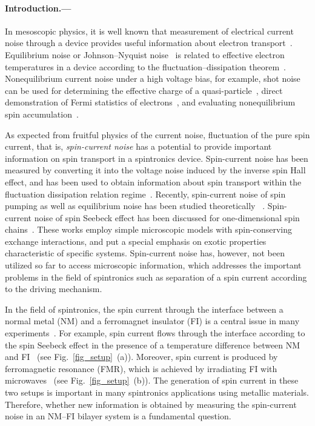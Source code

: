 \documentclass[aps,prl,reprint,showpacs]{revtex4-1}
\begin{document}
\paragraph{Introduction.---}
In mesoscopic physics, it is well known that measurement of electrical current noise 
through a device provides useful information about electron transport~\cite{Blanter00,Martin05}.
Equilibrium noise or Johnson--Nyquist noise~\cite{Johnson28,Nyquist28} is related
to effective electron temperatures in a device according to the fluctuation--dissipation theorem~\cite{Onsager31,Casimir45,Green54,Kubo57}.
Nonequilibrium current noise under a high voltage bias, for example, shot noise~\cite{Schottky18}
can be used for determining the effective charge of a quasi-particle~\cite{Picciotto97,Saminadayar97,Jehl00,Kozhevnikov00,Zarchin08, Ferrier16},
direct demonstration of Fermi statistics of electrons~\cite{Reznikov95,Kumar96,Buttiker90,Landauer91,Buttiker92,Martin92},
and evaluating nonequilibrium spin accumulation~\cite{Arakawa2015,Iwakiri17}.

As expected from fruitful physics of the current noise, 
fluctuation of the pure spin current, that is, {\it spin-current noise} has a potential to provide important information on spin transport in a spintronics device.
Spin-current noise has been measured by converting it into the voltage noise 
induced by the inverse spin Hall effect, and has been used to obtain information about spin transport within the fluctuation dissipation relation regime~\cite{Kamra14}.
Recently, spin-current noise of spin pumping as well as equilibrium noise has been studied theoretically
~\cite{Kamra16a,Kamra16b}.
Spin-current noise of spin Seebeck effect has been discussed for
one-dimensional spin chains~\cite{Aftergood17}. 
These works employ simple microscopic models with spin-conserving exchange interactions, and put a special emphasis on exotic properties characteristic of specific systems.
Spin-current noise has, however, not been utilized so far to access microscopic information, which addresses the important problems in the field of spintronics such as separation of a spin current according to the driving mechanism.

In the field of spintronics, the spin current through the interface between a normal metal (NM) and a ferromagnet insulator (FI) 
is a central issue in many experiments~\cite{MaekawaEd2012}.
For example, spin current flows through the interface according to the spin Seebeck effect 
in the presence of a temperature difference between NM and FI~\cite{Uchida08,Jaworski10,Uchida10,Xiao10,Adachi11,Ohnuma17} (see Fig.~\ref{fig_setup}~(a)).
Moreover, spin current is produced by ferromagnetic resonance (FMR), which is achieved by irradiating FI with microwaves~\cite{Tserkovnyak02,Konig03,Saitoh06,Kajiwara10,Ohnuma14} (see Fig.~\ref{fig_setup}~(b)).
The generation of spin current in these two setups is important in many spintronics applications using metallic materials.
Therefore, whether new information is obtained by measuring the spin-current noise in an NM--FI bilayer system is a fundamental question.
\end{document}
